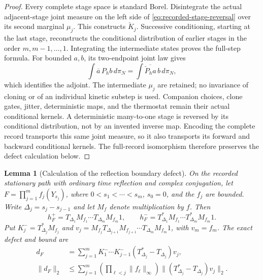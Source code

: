 \documentclass[11pt]{article}
\newtheorem{lemma}[theorem]{Lemma}
\theoremstyle{definition}
\theoremstyle{remark}
\begin{document}
\begin{proof}
Every complete stage space is standard Borel. Disintegrate the actual
adjacent-stage joint measure on the left side of
\eqref{eq:recorded-stage-reversal} over its second marginal $\mu_j$.
This constructs $\check K_j$. Successive conditioning, starting at the
last stage, reconstructs the conditional distribution of earlier stages
in the order $m,m-1,\ldots,1$. Integrating the intermediate states proves
the full-step formula. For bounded $a,b$, its two-endpoint joint law gives
\[
\int\overline a\,P_hb\,d\pi_N
=\int\overline{\check P_h a}\,b\,d\pi_N,
\]
which identifies the adjoint. The intermediate $\mu_j$ are retained;
no invariance of cloning or of an individual kinetic substep is used.
Companion choices, clone gates, jitter, deterministic maps, and the
thermostat remain their actual conditional kernels. A deterministic
many-to-one stage is reversed by its conditional distribution, not by
an invented inverse map. Encoding the complete record transports this
same joint measure, so it also transports its forward and backward
conditional kernels. The full-record isomorphism therefore preserves
the defect calculation below.
\end{proof}

\begin{lemma}[Calculation of the reflection boundary defect]
\label{lem:actual-reflection-boundary-defect}
On the recorded stationary path with ordinary time reflection and complex
conjugation, let $F=\prod_{j=1}^m f_j(Y_{s_j})$, where
$0<s_1<\cdots<s_m$, $s_0=0$, and the $f_j$ are bounded.
Write $\Delta_j=s_j-s_{j-1}$ and let $M_f$ denote multiplication by $f$.
Then
\begin{equation}
 h_F^+=T_{\Delta_1}M_{f_1}\cdots T_{\Delta_m}M_{f_m}1,
 \qquad
 h_F^-=T_{\Delta_1}^*M_{f_1}\cdots T_{\Delta_m}^*M_{f_m}1.
\label{eq:actual-forward-backward-cylinders}
\end{equation}
Put $K_j^-=T_{\Delta_j}^*M_{f_j}$ and
$v_j=M_{f_j}T_{\Delta_{j+1}}M_{f_{j+1}}\cdots
T_{\Delta_m}M_{f_m}1$, with $v_m=f_m$. The exact defect and bound are
\begin{align}
d_F&=\sum_{j=1}^mK_1^-\cdots K_{j-1}^-
                       (T_{\Delta_j}^*-T_{\Delta_j})v_j,
\label{eq:actual-reflection-telescoping}\\
\|d_F\|_2
&\le\sum_{j=1}^m\left(\prod_{\ell<j}\|f_\ell\|_\infty\right)
                    \|(T_{\Delta_j}^*-T_{\Delta_j})v_j\|_2.
\label{eq:actual-reflection-defect-bound}
\end{align}
\end{lemma}
\end{document}

